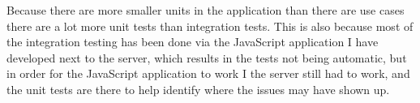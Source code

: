 Because there are more smaller units in the application than there are use cases
there are a lot more unit tests than integration tests. This is also because
most of the integration testing has been done via the JavaScript application I
have developed next to the server, which results in the tests not being
automatic, but in order for the JavaScript application to work I the server
still had to work, and the unit tests are there to help identify where the
issues may have shown up.
